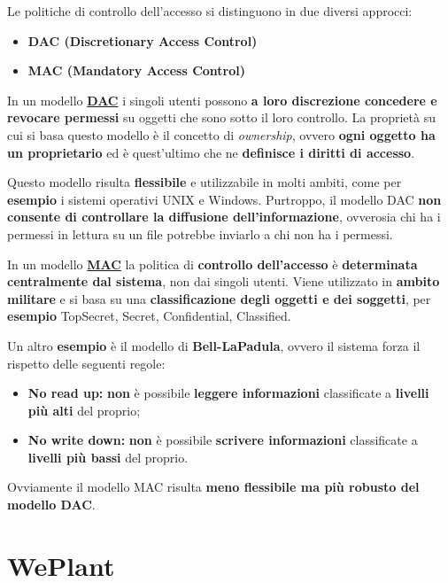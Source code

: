 \documentclass[a4paper]{article}
\begin{document}
	Le politiche di controllo dell'accesso si distinguono in due diversi approcci:
	\begin{itemize}
		\item \textcolor{Red3}{\textbf{DAC (Discretionary Access Control)}}
		
		\item \textcolor{Red3}{\textbf{MAC (Mandatory Access Control)}}
	\end{itemize}
	In un modello \textbf{\underline{DAC}} i singoli utenti possono \textbf{a loro discrezione concedere e revocare permessi} su oggetti che sono sotto il loro controllo. La proprietà su cui si basa questo modello è il concetto di \emph{ownership}, ovvero \textbf{ogni oggetto ha un proprietario} ed è quest'ultimo che ne \textbf{definisce i diritti di accesso}.
	
	Questo modello risulta \textbf{flessibile} e utilizzabile in molti ambiti, come per \textcolor{Green4}{\textbf{esempio}} i sistemi operativi UNIX e Windows. Purtroppo, il modello DAC \textbf{non consente di controllare la diffusione dell'informazione}, ovverosia chi ha i permessi in lettura su un file potrebbe inviarlo a chi non ha i permessi.\newline
	
	\noindent
	In un modello \textbf{\underline{MAC}} la politica di \textbf{controllo dell'accesso} è \textbf{determinata centralmente dal sistema}, non dai singoli utenti. Viene utilizzato in \textbf{ambito militare} e si basa su una \textbf{classificazione degli oggetti e dei soggetti}, per \textcolor{Green4}{\textbf{esempio}} TopSecret, Secret, Confidential, Classified.
	
	Un altro \textcolor{Green4}{\textbf{esempio}} è il modello di \textbf{Bell-LaPadula}, ovvero il sistema forza il rispetto delle seguenti regole:
	\begin{itemize}
		\item \textbf{No read up:} \textbf{non} è possibile \textbf{leggere informazioni} classificate a \textbf{livelli più alti} del proprio;
		
		\item \textbf{No write down:} \textbf{non} è possibile \textbf{scrivere informazioni} classificate a \textbf{livelli più bassi} del proprio.
	\end{itemize}
	Ovviamente il modello MAC risulta \textbf{meno flessibile ma più robusto del modello DAC}.\newpage
	
	\section{WePlant}
	
\end{document}
